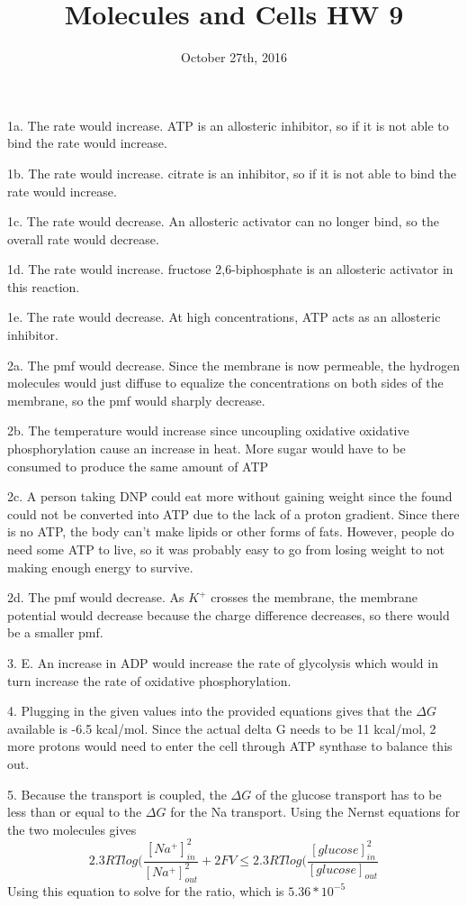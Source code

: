 \documentclass{article}
\title{Molecules and Cells HW 9}
\date{October 27th, 2016}
\begin{document}
\maketitle
1a. The rate would increase. ATP is an allosteric inhibitor, so if it is not able to bind the rate would increase.

1b. The rate would increase. citrate is an inhibitor, so if it is not able to bind the rate would increase.

1c. The rate would decrease. An allosteric activator can no longer bind, so the overall rate would decrease.

1d. The rate would increase. fructose 2,6-biphosphate is an allosteric activator in this reaction.

1e. The rate would decrease. At high concentrations, ATP acts as an allosteric inhibitor.

2a. The pmf would decrease. Since the membrane is now permeable, the hydrogen molecules would just diffuse to equalize the concentrations on both sides of the membrane, so the pmf would sharply decrease. 

2b. The temperature would increase since uncoupling oxidative oxidative phosphorylation cause an increase in heat. More sugar would have to be consumed to produce the same amount of ATP

2c. A person taking DNP could eat more without gaining weight since the found could not be converted into ATP due to the lack of a proton gradient. Since there is no ATP, the body can't make lipids or other forms of fats. However, people do need some ATP to live, so it was probably easy to go from losing weight to not making enough energy to survive.

2d. The pmf would decrease. As $K^+$ crosses the membrane, the membrane potential would decrease because the charge difference decreases, so there would be a smaller pmf.

3. E. An increase in ADP would increase the rate of glycolysis which would in turn increase the rate of oxidative phosphorylation.

4. Plugging in the given values into the provided equations gives that the $\Delta G$ available is -6.5 kcal/mol. Since the actual delta G needs to be 11 kcal/mol, 2 more protons would need to enter the cell through ATP synthase to balance this out.


5. Because the transport is coupled, the $\Delta G$ of the glucose transport has to be less than or equal to the $\Delta G$ for the Na transport. Using the Nernst equations for the two molecules gives
$$2.3RTlog(\frac{[Na^+]^2_{in}}{[Na^+]^2_{out}}+2FV\leq 2.3RTlog(\frac{[glucose]_{in}^2}{[glucose]_{out}}$$
Using this equation to solve for the ratio, which is $5.36 * 10^{-5}$
\end{document}
